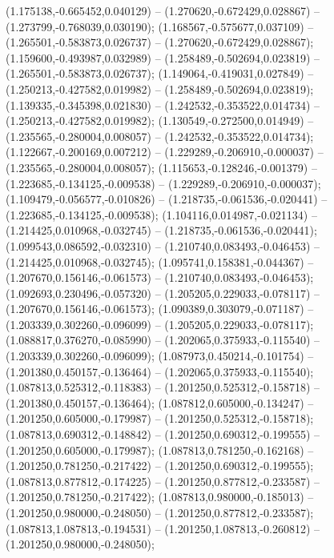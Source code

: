  (1.175138,-0.665452,0.040129) -- (1.270620,-0.672429,0.028867) -- (1.273799,-0.768039,0.030190);
 (1.168567,-0.575677,0.037109) -- (1.265501,-0.583873,0.026737) -- (1.270620,-0.672429,0.028867);
 (1.159600,-0.493987,0.032989) -- (1.258489,-0.502694,0.023819) -- (1.265501,-0.583873,0.026737);
 (1.149064,-0.419031,0.027849) -- (1.250213,-0.427582,0.019982) -- (1.258489,-0.502694,0.023819);
 (1.139335,-0.345398,0.021830) -- (1.242532,-0.353522,0.014734) -- (1.250213,-0.427582,0.019982);
 (1.130549,-0.272500,0.014949) -- (1.235565,-0.280004,0.008057) -- (1.242532,-0.353522,0.014734);
 (1.122667,-0.200169,0.007212) -- (1.229289,-0.206910,-0.000037) -- (1.235565,-0.280004,0.008057);
 (1.115653,-0.128246,-0.001379) -- (1.223685,-0.134125,-0.009538) -- (1.229289,-0.206910,-0.000037);
 (1.109479,-0.056577,-0.010826) -- (1.218735,-0.061536,-0.020441) -- (1.223685,-0.134125,-0.009538);
 (1.104116,0.014987,-0.021134) -- (1.214425,0.010968,-0.032745) -- (1.218735,-0.061536,-0.020441);
 (1.099543,0.086592,-0.032310) -- (1.210740,0.083493,-0.046453) -- (1.214425,0.010968,-0.032745);
 (1.095741,0.158381,-0.044367) -- (1.207670,0.156146,-0.061573) -- (1.210740,0.083493,-0.046453);
 (1.092693,0.230496,-0.057320) -- (1.205205,0.229033,-0.078117) -- (1.207670,0.156146,-0.061573);
 (1.090389,0.303079,-0.071187) -- (1.203339,0.302260,-0.096099) -- (1.205205,0.229033,-0.078117);
 (1.088817,0.376270,-0.085990) -- (1.202065,0.375933,-0.115540) -- (1.203339,0.302260,-0.096099);
 (1.087973,0.450214,-0.101754) -- (1.201380,0.450157,-0.136464) -- (1.202065,0.375933,-0.115540);
 (1.087813,0.525312,-0.118383) -- (1.201250,0.525312,-0.158718) -- (1.201380,0.450157,-0.136464);
 (1.087812,0.605000,-0.134247) -- (1.201250,0.605000,-0.179987) -- (1.201250,0.525312,-0.158718);
 (1.087813,0.690312,-0.148842) -- (1.201250,0.690312,-0.199555) -- (1.201250,0.605000,-0.179987);
 (1.087813,0.781250,-0.162168) -- (1.201250,0.781250,-0.217422) -- (1.201250,0.690312,-0.199555);
 (1.087813,0.877812,-0.174225) -- (1.201250,0.877812,-0.233587) -- (1.201250,0.781250,-0.217422);
 (1.087813,0.980000,-0.185013) -- (1.201250,0.980000,-0.248050) -- (1.201250,0.877812,-0.233587);
 (1.087813,1.087813,-0.194531) -- (1.201250,1.087813,-0.260812) -- (1.201250,0.980000,-0.248050);
